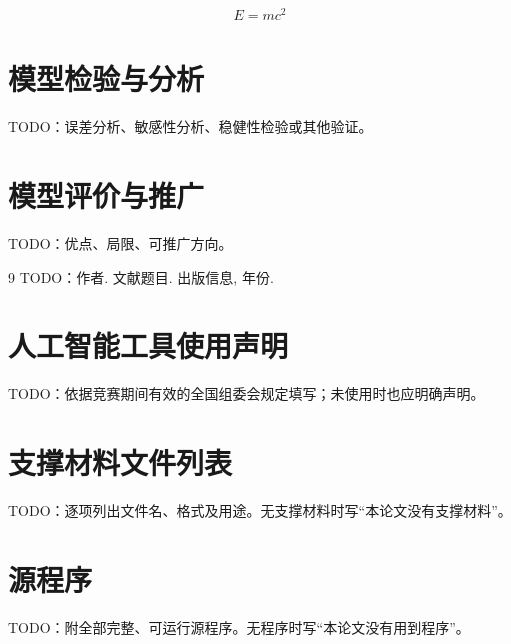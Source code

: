 \documentclass{cumcmthesis}
\begin{document}
\begin{equation}
E=mc^2
\label{eq:demo}
\end{equation}


\section{模型检验与分析}
\label{sec:validation}
TODO：误差分析、敏感性分析、稳健性检验或其他验证。

\section{模型评价与推广}
\label{sec:evaluation}
TODO：优点、局限、可推广方向。

\begin{thebibliography}{9}
    TODO：作者.
    \newblock 文献题目.
    \newblock 出版信息, 年份.
\end{thebibliography}

\section*{人工智能工具使用声明}
TODO：依据竞赛期间有效的全国组委会规定填写；未使用时也应明确声明。

\begin{appendices}

\section{支撑材料文件列表}
TODO：逐项列出文件名、格式及用途。无支撑材料时写“本论文没有支撑材料”。

\section{源程序}
TODO：附全部完整、可运行源程序。无程序时写“本论文没有用到程序”。

\end{appendices}
\end{document}
